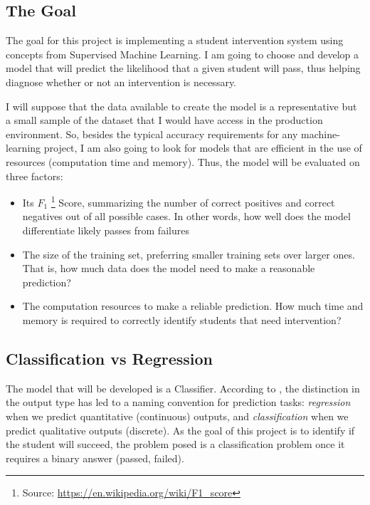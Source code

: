 \documentclass[a4paper]{article}
\begin{document}
\subsection{The Goal}
The goal for this project is implementing a student intervention system using concepts from Supervised Machine Learning. I am going to choose and develop a model that will predict the likelihood that a given student will pass, thus helping diagnose whether or not an intervention is necessary.

I will suppose that the data available to create the model is a representative but a small sample of the dataset that I would have access in the production environment. So, besides the typical accuracy requirements for any machine-learning project, I am also going to look for models that are efficient in the use of resources (computation time and memory). Thus, the model will be evaluated on three factors:

\begin{itemize}
\item Its $F_1$ \footnote{Source: \url{https://en.wikipedia.org/wiki/F1_score}} Score, summarizing the number of correct positives and correct negatives out of all possible cases. In other words, how well does the model differentiate likely passes from failures
\item The size of the training set, preferring smaller training sets over larger ones. That is, how much data does the model need to make a reasonable prediction?
\item The computation resources to make a reliable prediction. How much time and memory is required to correctly identify students that need intervention?
\end{itemize}

\subsection{Classification vs Regression}
The model that will be developed is a Classifier. According to \cite{Hastie_2009}, the distinction in the output type has led to a naming convention for prediction tasks: \textit{regression} when we predict quantitative (continuous) outputs, and \textit{classification} when we predict qualitative outputs (discrete). As the goal of this project is to identify if the student will succeed, the problem posed is a classification problem once it requires a binary answer (passed, failed).

\end{document}
